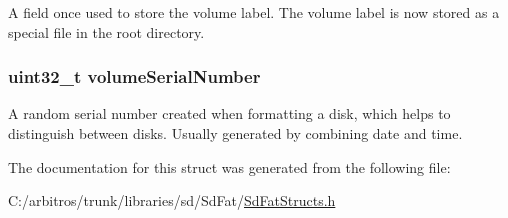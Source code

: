 A field once used to store the volume label. The volume label is now stored as a special file in the root directory. \hypertarget{structfat32__boot_a7c9ffcee12051cefe1724e8024af25f8}{
\subsubsection[{volume\-Serial\-Number}]{\setlength{\rightskip}{0pt plus 5cm}uint32\-\_\-t volume\-Serial\-Number}}\label{structfat32__boot_a7c9ffcee12051cefe1724e8024af25f8}
A random serial number created when formatting a disk, which helps to distinguish between disks. Usually generated by combining date and time. 

The documentation for this struct was generated from the following file\-:\begin{DoxyCompactItemize}
\item 
C\-:/arbitros/trunk/libraries/sd/\-Sd\-Fat/\hyperlink{_sd_fat_structs_8h}{Sd\-Fat\-Structs.\-h}\end{DoxyCompactItemize}

